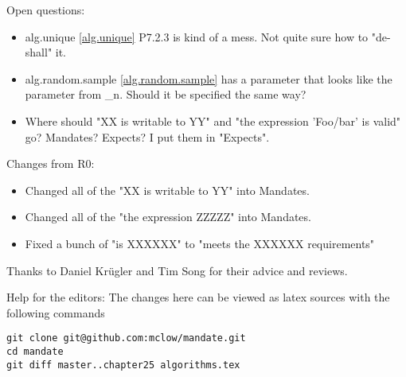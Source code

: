 Open questions:
\begin{itemize}
\item{alg.unique \ref{alg.unique} P7.2.3 is kind of a mess. Not quite sure how to "de-shall" it.}
\item{alg.random.sample \ref{alg.random.sample} has a  parameter that looks like the  parameter from \*_n. Should it be specified the same way?}
\item{Where should "XX is writable to YY" and "the expression 'Foo/bar' is valid" go? Mandates? Expects? I put them in "Expects".}
\end{itemize}


Changes from R0:
\begin{itemize}
\item{Changed all of the "XX is writable to YY" into Mandates.}
\item{Changed all of the "the expression ZZZZZ" into Mandates.}
\item{Fixed a bunch of "is XXXXXX" to "meets the XXXXXX requirements"}
\end{itemize}

Thanks to Daniel Krügler and Tim Song for their advice and reviews.
 
\vfill
Help for the editors: The changes here can be viewed as latex sources with the following commands
\begin{verbatim}
git clone git@github.com:mclow/mandate.git
cd mandate
git diff master..chapter25 algorithms.tex
\end{verbatim}
